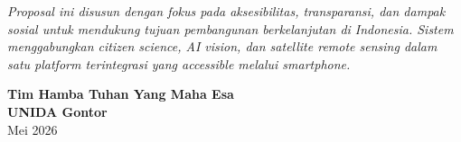 \documentclass[12pt,a4paper]{article}
\begin{document}
\begin{center}
  \textit{Proposal ini disusun dengan fokus pada aksesibilitas, transparansi, dan dampak sosial untuk mendukung tujuan pembangunan berkelanjutan di Indonesia. Sistem menggabungkan citizen science, AI vision, dan satellite remote sensing dalam satu platform terintegrasi yang accessible melalui smartphone.}
\end{center}

\vspace{1cm}

\begin{flushright}
  \textbf{Tim Hamba Tuhan Yang Maha Esa} \\
  \textbf{UNIDA Gontor} \\
  Mei 2026
\end{flushright}
\end{document}
